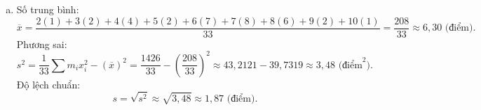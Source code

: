 \begin{bt}
{\begin{enumerate}[a)]
			\begin{itemize}
				\item Vì $n = 33$ lẻ nên trung vị $Q_2$ là điểm của học sinh ở vị trí thứ $\dfrac{33 + 1}{2} = 17$.\\
				Tần số tích lũy đến điểm 6 là $1 + 2 + 4 + 2 + 7 = 16$ học sinh. Do đó học sinh thứ 17 đạt điểm 7 $\implies Q_2 = 7$ điểm.
				\item Nửa dãy phía dưới gồm 16 học sinh đầu (từ vị trí 1 đến 16). Tứ phân vị thứ nhất $Q_1$ là trung bình cộng của học sinh thứ 8 và thứ 9. Cả hai học sinh này đều đạt điểm 5 $\implies Q_1 = 5$ điểm.
				\item Nửa dãy phía trên gồm 16 học sinh cuối (từ vị trí 18 đến 33). Tứ phân vị thứ ba $Q_3$ là trung bình cộng của học sinh thứ 25 và thứ 26 ($17 + 8 = 25$ và 26). Cả hai học sinh này đều đạt điểm 8 $\implies Q_3 = 8$ điểm.
			\end{itemize}
			Khoảng tứ phân vị:
			\[\Delta_Q = Q_3 - Q_1 = 8 - 5 = 3\text{ (điểm)}.\]
			\item Số trung bình:
			\[\overline{x} = \frac{2(1) + 3(2) + 4(4) + 5(2) + 6(7) + 7(8) + 8(6) + 9(2) + 10(1)}{33} = \frac{208}{33} \approx 6{,}30\text{ (điểm)}.\]
			Phương sai:
			\[s^2 = \frac{1}{33}\sum m_i x_i^2 - (\overline{x})^2 = \frac{1426}{33} - \left(\frac{208}{33}\right)^2 \approx 43{,}2121 - 39{,}7319 \approx 3{,}48\text{ (điểm}^2\text{)}.\]
			Độ lệch chuẩn:
			\[s = \sqrt{s^2} \approx \sqrt{3{,}48} \approx 1{,}87\text{ (điểm)}.\]
		\end{enumerate}
	}
\end{bt}

